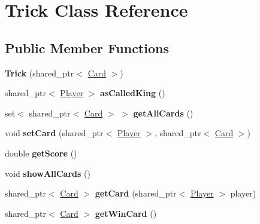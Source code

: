\hypertarget{classTrick}{\section{\-Trick \-Class \-Reference}
\label{classTrick}
}
\subsection*{\-Public \-Member \-Functions}
\begin{DoxyCompactItemize}
\item 
\hypertarget{classTrick_a84768e197bf608cb36f9bcfd5b894931}{{\bfseries \-Trick} (shared\-\_\-ptr$<$ \hyperlink{classCard}{\-Card} $>$)}\label{classTrick_a84768e197bf608cb36f9bcfd5b894931}

\item 
\hypertarget{classTrick_a3e98bee722ab6bfcbd659cb34af77202}{shared\-\_\-ptr$<$ \hyperlink{classPlayer}{\-Player} $>$ {\bfseries as\-Called\-King} ()}\label{classTrick_a3e98bee722ab6bfcbd659cb34af77202}

\item 
\hypertarget{classTrick_af77e35811aad04dcbd8b5c5e28a211a1}{set$<$ shared\-\_\-ptr$<$ \hyperlink{classCard}{\-Card} $>$ $>$ {\bfseries get\-All\-Cards} ()}\label{classTrick_af77e35811aad04dcbd8b5c5e28a211a1}

\item 
\hypertarget{classTrick_af1da4b44a0dbfb2eaac4edc5ef0cde85}{void {\bfseries set\-Card} (shared\-\_\-ptr$<$ \hyperlink{classPlayer}{\-Player} $>$, shared\-\_\-ptr$<$ \hyperlink{classCard}{\-Card} $>$)}\label{classTrick_af1da4b44a0dbfb2eaac4edc5ef0cde85}

\item 
\hypertarget{classTrick_ae5b1563e923896a2fe0c5a09113b494b}{double {\bfseries get\-Score} ()}\label{classTrick_ae5b1563e923896a2fe0c5a09113b494b}

\item 
\hypertarget{classTrick_a24eae8424ae5666d362dc0a9e514faa4}{void {\bfseries show\-All\-Cards} ()}\label{classTrick_a24eae8424ae5666d362dc0a9e514faa4}

\item 
\hypertarget{classTrick_a29246478abfaf149e3ba10396e3f1b05}{shared\-\_\-ptr$<$ \hyperlink{classCard}{\-Card} $>$ {\bfseries get\-Card} (shared\-\_\-ptr$<$ \hyperlink{classPlayer}{\-Player} $>$ player)}\label{classTrick_a29246478abfaf149e3ba10396e3f1b05}

\item 
\hypertarget{classTrick_a38816b1d7ccd9c8d576539463b6de715}{shared\-\_\-ptr$<$ \hyperlink{classCard}{\-Card} $>$ {\bfseries get\-Win\-Card} ()}\label{classTrick_a38816b1d7ccd9c8d576539463b6de715}


\end{DoxyCompactItemize}
